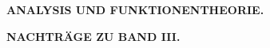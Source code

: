 \clearpage
{}

\vspace*{4cm}
\begin{center}
\textbf{\Large ANALYSIS UND FUNKTIONENTHEORIE.}

\vspace{1em}
\textbf{NACHTRÄGE ZU BAND III.}
\end{center}
\clearpage
